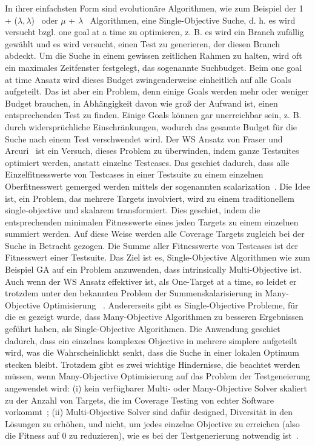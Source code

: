 \documentclass{article}
\begin{document}
In ihrer einfachsten Form sind evolutionäre Algorithmen, wie zum Beispiel der 1 + ($\lambda,\lambda$)~\cite{Doerr2015} oder $\mu$ + $\lambda$~\cite{TerSarkisov2011} Algorithmen, eine Single-Objective Suche, d. h. es wird versucht bzgl. one goal at a time zu optimieren, z. B. es wird ein Branch zufällig gewählt und es wird versucht, einen Test zu generieren, der diesen Branch abdeckt. Um die Suche in einem gewissen zeitlichen Rahmen zu halten, wird oft ein maximales Zeitfenster festgelegt, das sogenannte Suchbudget. Beim one goal at time Ansatz wird dieses Budget zwingenderweise einheitlich auf alle Goals aufgeteilt. Das ist aber ein Problem, denn einige Goals werden mehr oder weniger Budget brauchen, in Abhängigkeit davon wie groß der Aufwand ist, einen entsprechenden Test zu finden. Einige Goals können gar unerreichbar sein, z. B. durch widersprüchliche Einschränkungen, wodurch das gesamte Budget für die Suche nach einem Test verschwendet wird. Der \ac{WS} Ansatz von Fraser und Arcuri~\cite{Fraser_2013} ist ein Versuch, dieses Problem zu überwinden, indem ganze Testsuites optimiert werden, anstatt einzelne Testcases. Das geschiet dadurch, dass alle Einzelfitnesswerte von Testcases in einer Testsuite zu einem einzelnen Oberfitnesswert gemerged werden mittels der sogenannten scalarization~\cite{Deb2014}. Die Idee ist, ein Problem, das mehrere Targets involviert, wird zu einem traditionellem single-objective und skalarem transformiert. Dies geschiet, indem die entsprechenden minimalen Fitnesswerte eines jeden Targets zu einem einzelnen summiert werden. Auf diese Weise werden alle Coverage Targets zugleich bei der Suche in Betracht gezogen. Die Summe aller Fitnesswerte von Testcases ist der Fitnesswert einer Testsuite. Das Ziel ist es, Single-Objective Algorithmen wie zum Beispiel \ac{GA} auf ein Problem anzuwenden, dass intrinsically Multi-Objective ist. Auch wenn der \ac{WS} Ansatz effektiver ist, als One-Target at a time, so leidet er trotzdem unter den bekannten Problem der Summenskalarisierung in Many-Objective Optimisierung~\cite{Deb2014} . Andererseits gibt es Single-Objective Probleme, für die es gezeigt wurde, dass Many-Objective Algorithmen zu besseren Ergebnissen geführt haben, als Single-Objective Algorithmen. Die Anwendung geschiet dadurch, dass ein einzelnes komplexes Objective in mehrere simplere aufgeteilt wird, was die Wahrscheinlichkt senkt, dass die Suche in einer lokalen Optimum stecken bleibt. Trotzdem gibt es zwei wichtige Hindernisse, die beachtet werden müssen, wenn Many-Objective Optimisierung auf das Problem der Testgeneierung angewendet wird: (i) kein verfügbarer Multi- oder Many-Objective Solver skaliert zu der Anzahl von Targets, die im Coverage Testing von echter Software vorkommt~\cite{Arcuri_2014}; (ii) Multi-Objective Solver sind dafür designed, Diversität in den Lösungen zu erhöhen, und nicht, um jedes einzelne Objective zu erreichen (also die Fitness auf 0 zu reduzieren), wie es bei der Testgenerierung notwendig ist~\cite{Panichella2018}. 
\end{document}

